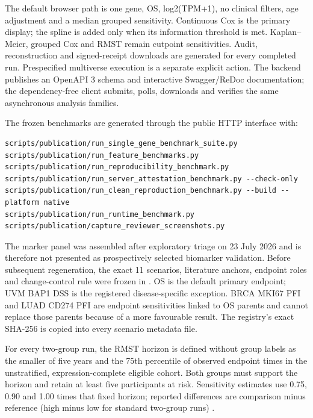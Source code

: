 \documentclass[12pt]{article}
\begin{document}
The default browser path is one gene, OS, log2(TPM+1), no clinical filters,
age adjustment and a median grouped sensitivity. Continuous Cox is the primary
display; the spline is added only when its information threshold is met.
Kaplan--Meier, grouped Cox and RMST remain cutpoint sensitivities. Audit,
reconstruction and signed-receipt downloads are generated for every completed
run. Prespecified multiverse execution is a separate explicit action.
The backend publishes an OpenAPI 3 schema and interactive Swagger/ReDoc
documentation; the dependency-free  client
submits, polls, downloads and verifies the same asynchronous analysis
families.

The frozen benchmarks are generated through the public HTTP interface with:

\begin{verbatim}
scripts/publication/run_single_gene_benchmark_suite.py
scripts/publication/run_feature_benchmarks.py
scripts/publication/run_reproducibility_benchmark.py
scripts/publication/run_server_attestation_benchmark.py --check-only
scripts/publication/run_clean_reproduction_benchmark.py --build --platform native
scripts/publication/run_runtime_benchmark.py
scripts/publication/capture_reviewer_screenshots.py
\end{verbatim}

The marker panel was assembled after exploratory triage on 23 July 2026 and is
therefore not presented as prospectively selected biomarker validation. Before
subsequent regeneration, the exact 11 scenarios, literature anchors, endpoint
roles and change-control rule were frozen in
. OS is the default
primary endpoint; UVM BAP1 DSS is the registered disease-specific exception.
BRCA MKI67 PFI and LUAD CD274 PFI are endpoint sensitivities linked to OS
parents and cannot replace those parents because of a more favourable result.
The registry's exact SHA-256 is copied into every scenario metadata file.

For every two-group run, the RMST horizon is defined without group labels as
the smaller of five years and the 75th percentile of observed endpoint times in
the unstratified, expression-complete eligible cohort. Both groups must support
the horizon and retain at least five participants at risk. Sensitivity
estimates use 0.75, 0.90 and 1.00 times that fixed horizon; reported differences
are comparison minus reference (high minus low for standard two-group runs)
\citep{rmstBiomarker2016}.
\end{document}
